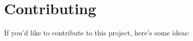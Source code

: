\documentclass[12pt]{article}
\begin{document}


\section*{Contributing}
If you'd like to contribute to this project, here's some ideas:
\printbibliography
\end{document}
